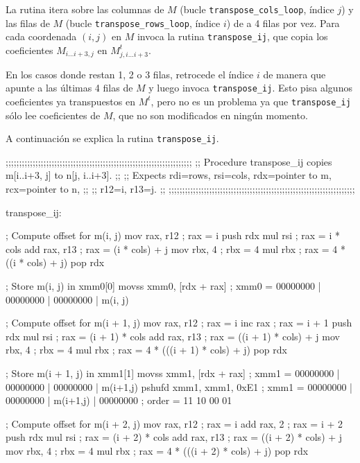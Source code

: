 \documentclass[a4paper, 10pt, twoside]{article}
\newcommand{\cc}[1]{\texttt{#1}}
\begin{document}
La rutina itera sobre las columnas de $M$ (bucle \cc{transpose\_cols\_loop},
índice $j$) y las filas de $M$ (bucle \cc{transpose\_rows\_loop}, índice $i$)
de a 4 filas por vez. Para cada coordenada $(i,j)$ en $M$ invoca la rutina
\cc{transpose\_ij}, que copia los coeficientes $M_{i \ldots i+3,j}$ en
$M^t_{j,i \ldots i+3}$.

En los casos donde restan 1, 2 o 3 filas, retrocede el índice $i$ de manera que
apunte a las últimas 4 filas de $M$ y luego invoca \cc{transpose\_ij}. Esto
pisa algunos coeficientes ya transpuestos en $M^t$, pero no es un problema ya
que \cc{transpose\_ij} sólo lee coeficientes de $M$, que no son modificados en
ningún momento.

A continuación se explica la rutina \cc{transpose\_ij}.

\begin{code}
  ;;;;;;;;;;;;;;;;;;;;;;;;;;;;;;;;;;;;;;;;;;;;;;;;;;;;;;;;;;;;;;;;;;;;;
  ;; Procedure transpose_ij copies m[i..i+3, j] to n[j, i..i+3].     ;;
  ;; Expects rdi=rows, rsi=cols, rdx=pointer to m, rcx=pointer to n, ;;
  ;; r12=i, r13=j.                                                   ;;
  ;;;;;;;;;;;;;;;;;;;;;;;;;;;;;;;;;;;;;;;;;;;;;;;;;;;;;;;;;;;;;;;;;;;;;

  transpose_ij:

    ; Compute offset for m(i, j)
    mov rax, r12             ; rax = i
    push rdx
    mul rsi                  ; rax = i * cols
    add rax, r13             ; rax = (i * cols) + j
    mov rbx, 4               ; rbx = 4
    mul rbx                  ; rax = 4 * ((i * cols) + j)
    pop rdx

    ; Store m(i, j) in xmm0[0]
    movss xmm0, [rdx + rax]  ; xmm0 = 00000000  | 00000000 | 00000000 | m(i, j)

    ; Compute offset for m(i + 1, j)
    mov rax, r12             ; rax = i
    inc rax                  ; rax = i + 1
    push rdx
    mul rsi                  ; rax = (i + 1) * cols
    add rax, r13             ; rax = ((i + 1) * cols) + j
    mov rbx, 4               ; rbx = 4
    mul rbx                  ; rax = 4 * (((i + 1) * cols) + j)
    pop rdx

    ; Store m(i + 1, j) in xmm1[1]
    movss xmm1, [rdx + rax]  ; xmm1 = 00000000 | 00000000 | 00000000 | m(i+1,j)
    pshufd xmm1, xmm1, 0xE1  ; xmm1 = 00000000 | 00000000 | m(i+1,j) | 00000000
                             ; order = 11 10 00 01

    ; Compute offset for m(i + 2, j)
    mov rax, r12             ; rax = i
    add rax, 2               ; rax = i + 2
    push rdx
    mul rsi                  ; rax = (i + 2) * cols
    add rax, r13             ; rax = ((i + 2) * cols) + j
    mov rbx, 4               ; rbx = 4
    mul rbx                  ; rax = 4 * (((i + 2) * cols) + j)
    pop rdx


\end{code}
\end{document}
